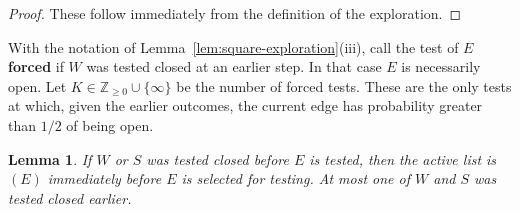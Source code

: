 \documentclass[11pt]{amsart}
\theoremstyle{plain}
\newtheorem{lemma}[theorem]{Lemma}
\theoremstyle{definition}
\newcommand{\Z}{\mathbb Z}
\newcommand{\defn}[1]{\textbf{#1}}
\begin{document}
	\begin{proof}
		These follow immediately from the definition of the exploration.
	\end{proof}
	
	With the notation of Lemma~\ref{lem:square-exploration}\textup{(iii)}, call the
	test of $E$ \defn{forced} if $W$ was tested closed at an earlier step.  In that
	case $E$ is necessarily open.  Let
	$K\in\Z_{\geq0}\cup\{\infty\}$ be the number of forced tests.  These are the
	only tests at which, given the earlier outcomes, the current edge has probability
	greater than $1/2$ of being open.

	\begin{lemma}\label{lem:square-active-list}
		If $W$ or $S$ was tested closed before $E$ is tested, then the active list is
		$(E)$ immediately before $E$ is selected for testing.  At most one of $W$ and $S$ was tested
		closed earlier.
	\end{lemma}
\end{document}
